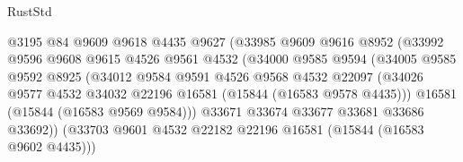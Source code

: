 \begin{lexlean}{RustStd}
\begin{coremodule}
                                    @3195
                                    @84
                                    @9609
                                    @9618
                                    @4435
                                    @9627
                                    (@33985
                                      @9609
                                      @9616
                                      @8952
                                      (@33992
                                        @9596
                                        @9608
                                        @9615
                                        @4526
                                        @9561
                                        @4532
                                        (@34000
                                          @9585
                                          @9594
                                          (@34005
                                            @9585
                                            @9592
                                            @8925
                                            (@34012
                                              @9584
                                              @9591
                                              @4526
                                              @9568
                                              @4532
                                              @22097
                                              (@34026
                                                @9577
                                                @4532
                                                @34032
                                                @22196
                                                @16581
                                                (@15844 (@16583 @9578 @4435)))
                                              @16581
                                              (@15844 (@16583 @9569 @9584)))
                                            @33671
                                            @33674
                                            @33677
                                            @33681
                                            @33686
                                            @33692))
                                        (@33703
                                          @9601
                                          @4532
                                          @22182
                                          @22196
                                          @16581
                                          (@15844 (@16583 @9602 @4435)))

\end{coremodule}
\end{lexlean}
